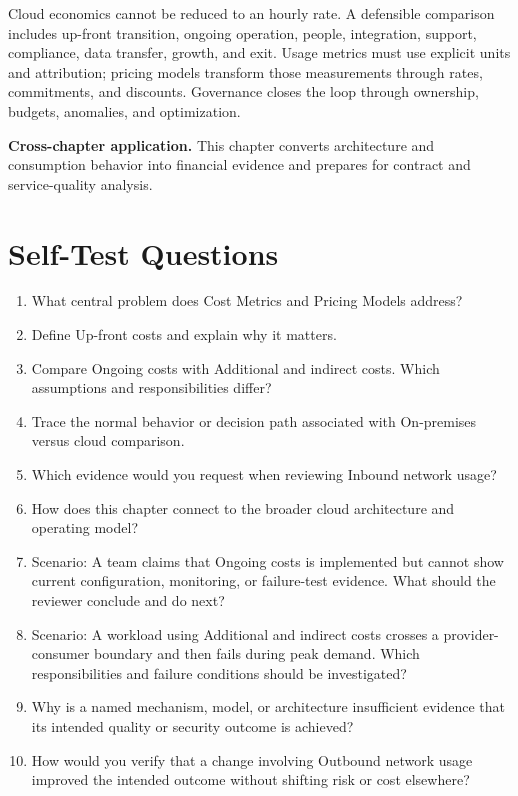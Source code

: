 \documentclass[11pt]{article}
\begin{document}
\begin{synthesisbox}
Cloud economics cannot be reduced to an hourly rate. A defensible comparison includes up-front transition, ongoing operation, people, integration, support, compliance, data transfer, growth, and exit. Usage metrics must use explicit units and attribution; pricing models transform those measurements through rates, commitments, and discounts. Governance closes the loop through ownership, budgets, anomalies, and optimization.
\par\smallskip
\textbf{Cross-chapter application.} This chapter converts architecture and consumption behavior into financial evidence and prepares for contract and service-quality analysis.
\end{synthesisbox}
\section{Self-Test Questions}
\begin{enumerate}
\item What central problem does Cost Metrics and Pricing Models address?
\item Define Up-front costs and explain why it matters.
\item Compare Ongoing costs with Additional and indirect costs. Which assumptions and responsibilities differ?
\item Trace the normal behavior or decision path associated with On-premises versus cloud comparison.
\item Which evidence would you request when reviewing Inbound network usage?
\item How does this chapter connect to the broader cloud architecture and operating model?
\item Scenario: A team claims that Ongoing costs is implemented but cannot show current configuration, monitoring, or failure-test evidence. What should the reviewer conclude and do next?
\item Scenario: A workload using Additional and indirect costs crosses a provider-consumer boundary and then fails during peak demand. Which responsibilities and failure conditions should be investigated?
\item Why is a named mechanism, model, or architecture insufficient evidence that its intended quality or security outcome is achieved?
\item How would you verify that a change involving Outbound network usage improved the intended outcome without shifting risk or cost elsewhere?
\end{enumerate}
\clearpage
\end{document}
